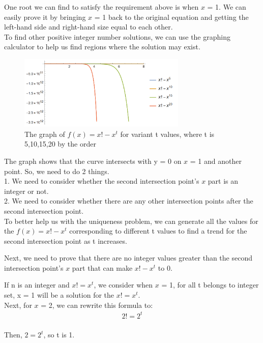 \documentclass{article}
\begin{document}
        One root we can find to satisfy the requirement above is when $x$ = 1. We can easily prove it by bringing $x$ = 1 back to the original equation and getting the left-hand side and right-hand size equal to each other. \\

        To find other positive integer number solutions, we can use the graphing calculator to help us find regions where the solution may exist.\\


        \newpage
        \begin{figure}[h]
        \centering
        \includegraphics[width=8cm]{301.png}
        \caption{The graph of $f(x) = x! - x ^{t}$ for variant t values, where t is 5,10,15,20 by the order}
    
        \end{figure}

        The graph shows that the curve intersects with y = 0 on $x$ = 1 and another point. So, we need to do 2 things.\\

        1. We need to consider whether the second intersection point's $x$ part is an integer or not.\\
        2. We need to consider whether there are any other intersection points after the second intersection point.\\

        To better help us with the uniqueness problem, we can generate all the values for the $f(x) = x! - x^{t}$ corresponding to different t values to find a trend for the second intersection point as t increases.

        Next, we need to prove that there are no integer values greater than the second intersection point's $x$ part that can make $x! - x ^ {t}$ to 0.

        If n is an integer and $x! = x^t$, we consider when $x$ = 1, for all t belongs to integer set, x = 1 will be a solution for the $x! = x^t$.\\

        Next, for $x$ = 2, we can rewrite this formula to:
            \begin{align*}
                2! = 2^t
            \end{align*}\\
        Then, $2 = 2^t$, so t is 1.\\
\end{document}
